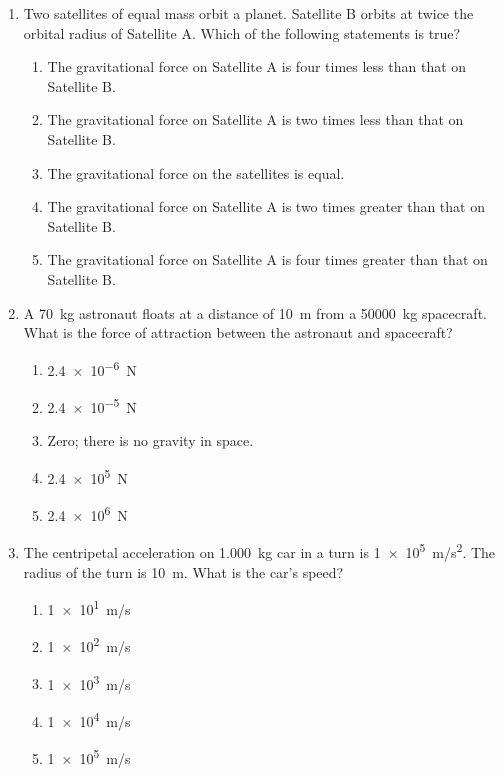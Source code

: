 \documentclass[12pt]{article}
\begin{document}
\begin{enumerate}[leftmargin=50pt,label=\underline{\hspace{0.4in}} \arabic*.]
\item Two satellites of equal mass orbit a planet. Satellite B orbits at twice
  the orbital radius of Satellite A. Which of the following statements is
  true?
  \begin{enumerate}[noitemsep,topsep=0pt,leftmargin=18pt]
  \item The gravitational force on Satellite A is four times less than that on
    Satellite B.
  \item The gravitational force on Satellite A is two times less than that on
    Satellite B.
  \item The gravitational force on the satellites is equal.
  \item The gravitational force on Satellite A is two times greater than that
    on Satellite B.
  \item The gravitational force on Satellite A is four times greater than that
    on Satellite B.
  \end{enumerate}
  
\item A \SI{70}{kg} astronaut floats at a distance of \SI{10}{m} from a
  \SI{50000}{kg} spacecraft. What is the force of attraction between the
  astronaut and spacecraft?
  \begin{enumerate}[noitemsep,topsep=0pt,leftmargin=18pt]
  \item\SI{2.4e-6}{N}
  \item\SI{2.4e-5}{N}
  \item Zero; there is no gravity in space.
  \item\SI{2.4e5}{N}
  \item\SI{2.4e6}{N}
  \end{enumerate}
  
\item The centripetal acceleration on \SI{1,000}{kg} car in a turn is
  \SI{1e5}{m/s^2}. The radius of the turn is \SI{10}{m}. What is the car's
  speed?
  \begin{enumerate}[noitemsep,topsep=0pt,leftmargin=18pt]
  \item\SI{1e1}{m/s}
  \item\SI{1e2}{m/s}
  \item\SI{1e3}{m/s}
  \item\SI{1e4}{m/s}
  \item\SI{1e5}{m/s}
  \end{enumerate}
  

\end{enumerate}
\end{document}
